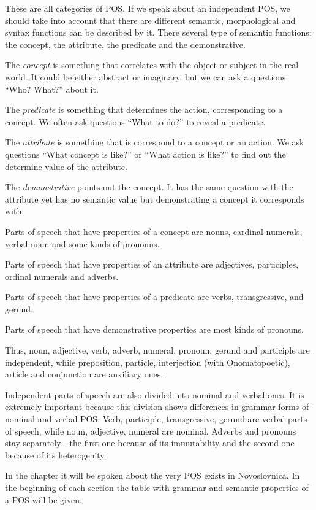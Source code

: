 These are all categories of POS. If we speak about an independent POS, we should take into account that there are different semantic, morphological and syntax functions can be described by it. There several type of semantic functions: the concept, the attribute, the predicate and the demonstrative.

The \textit{concept} is something that correlates with the object or subject in the real world. It could be either abstract or imaginary, but we can ask a questions “Who? What?” about it.

The \textit{predicate} is something that determines the action, corresponding to a concept. We often ask questions “What to do?” to reveal a predicate.

The \textit{attribute} is something that is correspond to a concept or an action. We ask questions “What concept is like?” or “What action is like?” to find out the determine value of the attribute.

The \textit{demonstrative} points out the concept. It has the same question with the attribute yet has no semantic value but demonstrating a concept it corresponds with. 

Parts of speech that have properties of a concept are nouns, cardinal numerals, verbal noun and some kinds of pronouns.

Parts of speech that have properties of an attribute are adjectives, participles, ordinal numerals and adverbs.

Parts of speech that have properties of a predicate are verbs, transgressive, and gerund.

Parts of speech that have demonstrative properties are most kinds of pronouns.

Thus, noun, adjective, verb, adverb, numeral, pronoun, gerund and participle are independent, while preposition, particle, interjection (with Onomatopoetic), article and conjunction are auxiliary ones.

Independent parts of speech are also divided into nominal and verbal ones. It is extremely important because this division shows differences in grammar forms of nominal and verbal POS. Verb, participle, transgressive, gerund are verbal parts of speech, while noun, adjective, numeral are nominal. Adverbs and pronouns stay separately - the first one because of its immutability and the second one because of its heterogenity. 

In the chapter it will be spoken about the very POS exists in Novoslovnica. In the beginning of each section the table with grammar and semantic properties of a POS will be given.

